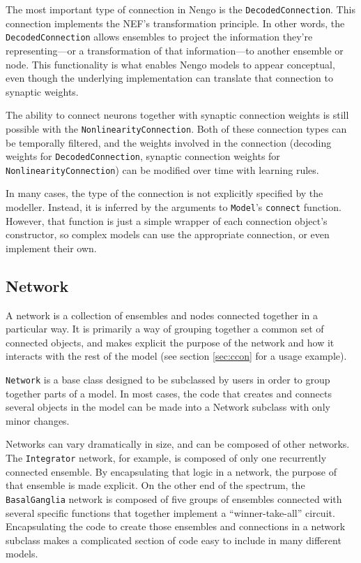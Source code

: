 \documentclass{frontiersSCNS}
\begin{document}
The most important type of connection
in Nengo is the \texttt{DecodedConnection}.
This connection implements
the NEF's transformation principle.
In other words, the \texttt{DecodedConnection}
allows ensembles to project
the information they're representing---or
a transformation of that information---to
another ensemble or node.
This functionality is what enables Nengo models
to appear conceptual,
even though the underlying implementation
can translate that connection
to synaptic weights.

The ability to connect neurons together
with synaptic connection weights is still possible
with the \texttt{NonlinearityConnection}.
Both of these connection types
can be temporally filtered,
and the weights involved in the connection
(decoding weights for \texttt{DecodedConnection},
synaptic connection weights for \texttt{NonlinearityConnection})
can be modified over time with learning rules.

In many cases, the type of the connection
is not explicitly specified by the modeller.
Instead, it is inferred by the arguments
to \texttt{Model}'s \texttt{connect} function.
However, that function is just a simple wrapper
of each connection object's constructor,
so complex models can use
the appropriate connection,
or even implement their own.

\subsection{Network}

A network is a collection of ensembles and nodes
connected together in a particular way.
It is primarily a way of grouping together
a common set of connected objects,
and makes explicit the purpose
of the network and how it interacts
with the rest of the model
(see section \ref{sec:ccon} for a usage example).

\texttt{Network} is a base class designed to be
subclassed by users
in order to group together
parts of a model.
In most cases,
the code that creates and connects
several objects in the model can be
made into a Network subclass
with only minor changes.

Networks can vary dramatically in size,
and can be composed of other networks.
The \texttt{Integrator} network, for example,
is composed of only one recurrently connected ensemble.
By encapsulating that logic in a network,
the purpose of that ensemble is made explicit.
On the other end of the spectrum,
the \texttt{BasalGanglia} network
is composed of five groups of ensembles
connected with several specific functions
that together implement a ``winner-take-all'' circuit.
Encapsulating the code to create those ensembles
and connections in a network subclass
makes a complicated section of code
easy to include in many different models.
\end{document}
